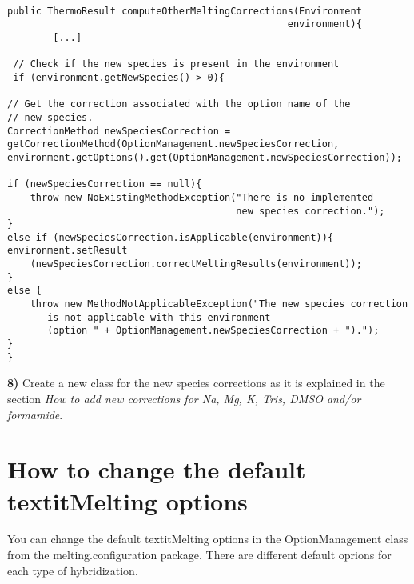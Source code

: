 \documentclass{article}
\begin{document}
\begin{verbatim}

public ThermoResult computeOtherMeltingCorrections(Environment 
                                                 environment){
		[...]
		
 // Check if the new species is present in the environment
 if (environment.getNewSpecies() > 0){
 
// Get the correction associated with the option name of the 
// new species.
CorrectionMethod newSpeciesCorrection = 
getCorrectionMethod(OptionManagement.newSpeciesCorrection, 
environment.getOptions().get(OptionManagement.newSpeciesCorrection));
			
if (newSpeciesCorrection == null){
	throw new NoExistingMethodException("There is no implemented 
	                                    new species correction.");
}
else if (newSpeciesCorrection.isApplicable(environment)){
environment.setResult
    (newSpeciesCorrection.correctMeltingResults(environment));
}
else {
	throw new MethodNotApplicableException("The new species correction 
	   is not applicable with this environment 
	   (option " + OptionManagement.newSpeciesCorrection + ").");
}
}

\end{verbatim}


\textbf{8)} Create a new class for the new species corrections as it is explained in the section
\textit{How to add new corrections for Na, Mg, K, Tris, DMSO and/or formamide}.

\section{How to change the default textit{Melting} options}

You can change the default textit{Melting} options in the OptionManagement class from the
melting.configuration package. There are different default oprions for each type of hybridization.
\end{document}
